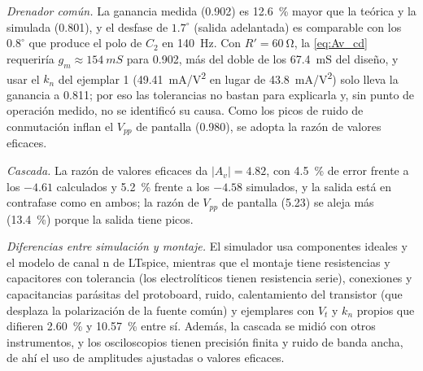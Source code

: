 \documentclass[conference]{IEEEtran}
\newcommand{\gm}{g_m}
\newcommand{\kn}{k_n}
\begin{document}
\textit{Drenador común.} La ganancia medida (0.902) es \SI{12.6}{\percent} mayor que la teórica y la simulada (0.801), y el desfase de $1.7^\circ$ (salida adelantada) es comparable con los $0.8^\circ$ que produce el polo de $C_2$ en \SI{140}{Hz}. Con $R'=\SI{60}{\ohm}$, la \eqref{eq:Av_cd} requeriría $\gm\approx\SI{154}{mS}$ para 0.902, más del doble de los \SI{67.4}{mS} del diseño, y usar el $\kn$ del ejemplar 1 (\SI{49.41}{mA/V^2} en lugar de \SI{43.8}{mA/V^2}) solo lleva la ganancia a 0.811; por eso las tolerancias no bastan para explicarla y, sin punto de operación medido, no se identificó su causa. Como los picos de ruido de conmutación inflan el $V_{pp}$ de pantalla (0.980), se adopta la razón de valores eficaces.

\textit{Cascada.} La razón de valores eficaces da $|A_v|=4.82$, con \SI{4.5}{\percent} de error frente a los $-4.61$ calculados y \SI{5.2}{\percent} frente a los $-4.58$ simulados, y la salida está en contrafase como en ambos; la razón de $V_{pp}$ de pantalla (5.23) se aleja más (\SI{13.4}{\percent}) porque la salida tiene picos.

\textit{Diferencias entre simulación y montaje.} El simulador usa componentes ideales y el modelo de canal n de LTspice, mientras que el montaje tiene resistencias y capacitores con tolerancia (los electrolíticos tienen resistencia serie), conexiones y capacitancias parásitas del protoboard, ruido, calentamiento del transistor (que desplaza la polarización de la fuente común) y ejemplares con $V_t$ y $\kn$ propios que difieren \SI{2.60}{\percent} y \SI{10.57}{\percent} entre sí. Además, la cascada se midió con otros instrumentos, y los osciloscopios tienen precisión finita y ruido de banda ancha, de ahí el uso de amplitudes ajustadas o valores eficaces.
\end{document}
